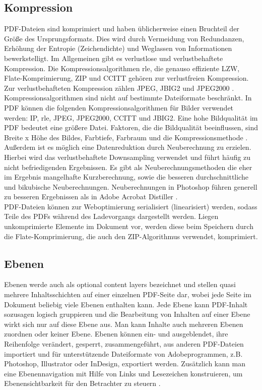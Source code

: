 \subsection{Kompression}
PDF-Dateien sind komprimiert und haben üblicherweise einen Bruchteil der Größe des Ursprungsformats. Dies wird durch Vermeidung von Redundanzen, Erhöhung der Entropie (Zeichendichte) und Weglassen von Informationen bewerkstelligt. Im Allgemeinen gibt es verlustlose und verlustbehaftete Kompression. Die Kompressionsalgorithmen \gls{rle}, die genauso effiziente LZW, Flate-Komprimierung, ZIP und CCITT gehören zur verlustfreien Kompression. Zur verlustbehafteten Kompression zählen JPEG, JBIG2 und JPEG2000 \cite{schneeberger}. Kompressionsalgorithmen sind nicht auf bestimmte Dateiformate beschränkt. In PDF können die folgenden Kompressionsalgorithmen für Bilder verwendet werden: IP, \gls{rle}, JPEG, JPEG2000, CCITT und JBIG2. Eine hohe Bildqualität im PDF bedeutet eine größere Datei. Faktoren, die die Bildqualität beeinflussen, sind Breite x Höhe des Bildes, Farbtiefe, Farbraum und die Kompressionsmethode \cite{softx}. \\
Außerdem ist es möglich eine Datenreduktion durch Neuberechnung zu erzielen. Hierbei wird das verlustbehaftete Downsampling verwendet und führt häufig zu nicht befriedigenden Ergebnissen. Es gibt als Neuberechnungsmethoden die eher im Ergebnis mangelhafte Kurzberechnung, sowie die besseren durchschnittliche und bikubische Neuberechnungen. Neuberechnungen in Photoshop führen generell zu besseren Ergebnissen als in Adobe Acrobat Distiller \cite{schneeberger}. \\
PDF-Dateien können zur Weboptimierung serialisiert (linearisiert) werden, sodass Teile des PDFs während des Ladevorgangs dargestellt werden. Liegen unkomprimierte Elemente im Dokument vor, werden diese beim Speichern durch die Flate-Komprimierung, die auch den ZIP-Algorithmus verwendet, komprimiert.

\subsection{Ebenen}
Ebenen werde auch als optional content layers bezeichnet und stellen quasi mehrere Inhaltsschichten auf einer einzelnen PDF-Seite dar, wobei jede Seite im Dokument beliebig viele Ebenen enthalten kann. Jede Ebene kann PDF-Inhalt sozusagen logisch gruppieren und die Bearbeitung von Inhalten auf einer Ebene wirkt sich nur auf diese Ebene aus. Man kann Inhalte auch mehreren Ebenen zuordnen oder keiner Ebene. Ebenen können ein- und ausgeblendet, ihre Reihenfolge verändert, gesperrt, zusammengeführt, aus anderen PDF-Dateien importiert und für unterstützende Dateiformate von Adobeprogrammen, z.B. Photoshop, Illustrator oder InDesign, exportiert werden. Zusätzlich kann man eine Ebenennavigation mit Hilfe von Links und Lesezeichen konstruieren, um Ebenensichtbarkeit für den Betrachter zu steuern \cite{adobe-ebenen}. 

